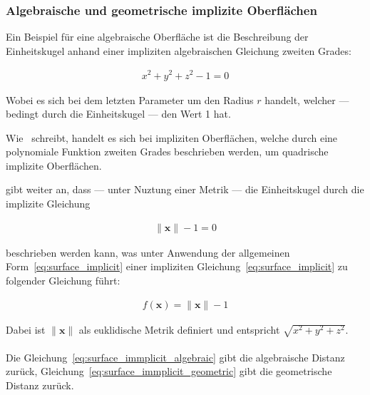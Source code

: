 \subsubsection{Algebraische und geometrische implizite Oberflächen}
\label{ssubsec:implicit_surfaces_algebraic_geometric}

Ein Beispiel für eine algebraische Oberfläche ist die Beschreibung der
Einheitskugel anhand einer impliziten algebraischen Gleichung zweiten Grades:

\begin{gather} \label{eq:surface_immplicit_algebraic}
    x^{2} + y^{2} + z^{2} - 1 = 0
\end{gather}

Wobei es sich bei dem letzten Parameter um den Radius $r$ handelt, welcher ---
bedingt durch die Einheitskugel --- den Wert 1 hat.

Wie~\cite{division_introduction_1996} schreibt, handelt es sich bei impliziten
Oberflächen, welche durch eine polynomiale Funktion zweiten Grades beschrieben
werden, um quadrische implizite Oberflächen.

\cite{hart_sphere_1994} gibt weiter an, dass --- unter Nuztung einer Metrik ---
die Einheitskugel durch die implizite Gleichung

\begin{gather} \label{eq:surface_immplicit_geometric}
    \|\bm{x}\| - 1 = 0
\end{gather}

beschrieben werden kann, was unter Anwendung der allgemeinen
Form~\ref{eq:surface_implicit} einer impliziten
Gleichung~\ref{eq:surface_implicit} zu folgender Gleichung führt:

\begin{gather}\label{eq:surface_implicit_sphere}
    f(\bm{x}) = \|\bm{x}\| - 1
\end{gather}


Dabei ist $\|\bm{x}\|$ als euklidische Metrik definiert und entspricht $\sqrt{x^{2} + y^{2} + z^{2}}$.\\
\\
Die Gleichung~\ref{eq:surface_immplicit_algebraic} gibt die algebraische
Distanz zurück, Gleichung~\ref{eq:surface_immplicit_geometric} gibt die
geometrische Distanz zurück.\\

